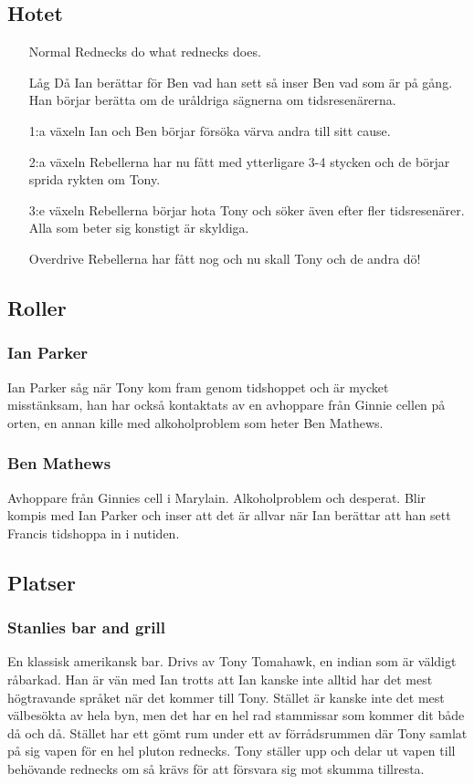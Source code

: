 \documentclass[a5paper,10pt]{report}
\begin{document}
\subsection{Hotet}
\begin{itemize}
  \item[Normal] Rednecks do what rednecks does.
  \item[Låg] Då Ian berättar för Ben vad han sett så inser Ben vad som är på gång. Han börjar berätta om de uråldriga sägnerna om tidsresenärerna.
  \item[1:a växeln] Ian och Ben börjar försöka värva andra till sitt cause.
  \item[2:a växeln] Rebellerna har nu fått med ytterligare 3-4 stycken och de börjar sprida rykten om Tony.
  \item[3:e växeln] Rebellerna börjar hota Tony och söker även efter fler tidsresenärer. Alla som beter sig konstigt är skyldiga.
  \item[Overdrive] Rebellerna har fått nog och nu skall Tony och de andra dö!
\end{itemize}
\subsection{Roller}
\subsubsection{Ian Parker}
Ian Parker såg när Tony kom fram genom tidshoppet och är mycket misstänksam, han har också kontaktats av en avhoppare från Ginnie cellen på orten, en annan kille med alkoholproblem som heter Ben Mathews.
\subsubsection{Ben Mathews}
Avhoppare från Ginnies cell i Marylain. Alkoholproblem och desperat. Blir kompis med Ian Parker och inser att det är allvar när Ian berättar att han sett Francis tidshoppa in i nutiden.
\subsection{Platser}
\subsubsection{Stanlies bar and grill}
En klassisk amerikansk bar. Drivs av Tony Tomahawk, en indian som är väldigt råbarkad. Han är vän med Ian trotts att Ian kanske inte alltid har det mest högtravande språket när det kommer till Tony. Stället är kanske inte det mest välbesökta av hela byn, men det har en hel rad stammissar som kommer dit både då och då. Stället har ett gömt rum under ett av förrådsrummen där Tony samlat på sig vapen för en hel pluton rednecks. Tony ställer upp och delar ut vapen till behövande rednecks om så krävs för att försvara sig mot skumma tillresta.
\end{document}
